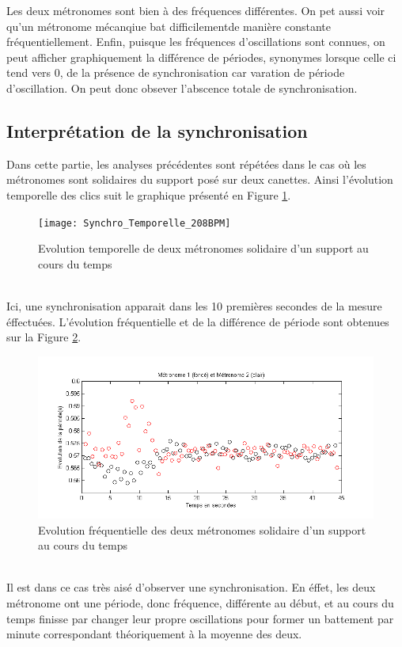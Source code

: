 \documentclass[a4paper,11pt]{report}
\begin{document}
Les deux métronomes sont bien à des fréquences différentes. On pet aussi voir qu'un métronome mécanqiue bat difficilementde manière constante fréquentiellement.
Enfin, puisque les fréquences d'oscillations sont connues, on peut afficher graphiquement la différence de périodes, synonymes lorsque celle ci tend vers 0, de la présence de synchronisation car varation de période d'oscillation. On peut donc obsever l'abscence totale de synchronisation.
\subsection{Interprétation de la synchronisation}
Dans cette partie, les analyses précédentes sont répétées dans le cas où les métronomes sont solidaires du support posé sur deux canettes. Ainsi l'évolution temporelle des clics suit le graphique présenté en Figure \ref{SynchronisationT}.
\begin{figure}[h]
\centering
\texttt{[image: Synchro\_Temporelle\_208BPM]}
\caption{Evolution temporelle de deux métronomes solidaire d'un support au cours du temps}\label{SynchronisationT}
\end{figure}\\
Ici, une synchronisation apparait dans les 10 premières secondes de la mesure éffectuées.
L'évolution fréquentielle et de la différence de période sont obtenues sur la Figure \ref{SynchronisationF}.
\begin{figure}[h]
\centering
\includegraphics[width=1\textwidth]{Synchro_Frequence_208BPM}
\caption{Evolution fréquentielle des deux métronomes solidaire d'un support au cours du temps}\label{SynchronisationF}
\end{figure}\\
Il est dans ce cas très aisé d'observer une synchronisation. En éffet, les deux métronome ont une période, donc fréquence, différente au début, et au cours du temps finisse par changer leur propre oscillations pour former un battement par minute correspondant théoriquement à la moyenne des deux.
\end{document}
